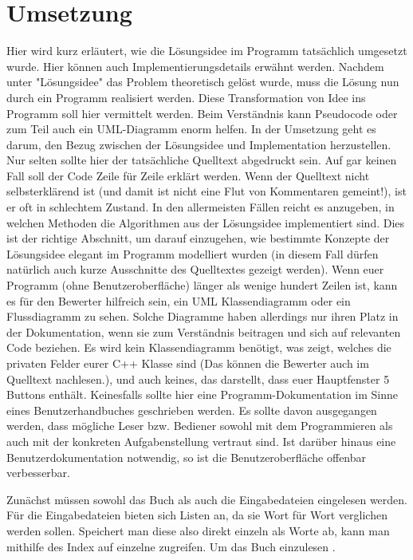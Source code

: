 \documentclass[a4paper,10pt,ngerman]{scrartcl}
\begin{document}
	\section{Umsetzung}\label{sec:umsetzung}
	Hier wird kurz erläutert, wie die Lösungsidee im Programm tatsächlich umgesetzt wurde.
	Hier können auch Implementierungsdetails erwähnt werden.
	Nachdem unter "Lösungsidee" das Problem theoretisch gelöst wurde, muss die Lösung nun durch ein Programm realisiert werden.
	Diese Transformation von Idee ins Programm soll hier vermittelt werden.
	Beim Verständnis kann Pseudocode oder zum Teil auch ein UML-Diagramm enorm helfen.
	In der Umsetzung geht es darum, den Bezug zwischen der Lösungsidee und Implementation herzustellen.
	Nur selten sollte hier der tatsächliche Quelltext abgedruckt sein.
	Auf gar keinen Fall soll der Code Zeile für Zeile erklärt werden.
	Wenn der Quelltext nicht selbsterklärend ist (und damit ist nicht eine Flut von Kommentaren gemeint!), ist er oft in schlechtem Zustand.
	In den allermeisten Fällen reicht es anzugeben, in welchen Methoden die Algorithmen aus der Lösungsidee implementiert sind.
	Dies ist der richtige Abschnitt, um darauf einzugehen, wie bestimmte Konzepte der Lösungsidee elegant im Programm modelliert wurden (in diesem Fall dürfen natürlich auch kurze Ausschnitte des Quelltextes gezeigt werden).
	Wenn euer Programm (ohne Benutzeroberfläche) länger als wenige hundert Zeilen ist, kann es für den Bewerter hilfreich sein, ein UML Klassendiagramm oder ein Flussdiagramm zu sehen.
	Solche Diagramme haben allerdings nur ihren Platz in der Dokumentation, wenn sie zum Verständnis beitragen und sich auf relevanten Code beziehen.
	Es wird kein Klassendiagramm benötigt, was zeigt, welches die privaten Felder eurer C++ Klasse sind (Das können die Bewerter auch im Quelltext nachlesen.), und auch keines, das darstellt, dass euer Hauptfenster 5 Buttons enthält.
	Keinesfalls sollte hier eine Programm-Dokumentation im Sinne eines Benutzerhandbuches geschrieben werden.
	Es sollte davon ausgegangen werden, dass mögliche Leser bzw. Bediener sowohl mit dem Programmieren als auch mit der konkreten Aufgabenstellung vertraut sind.
	Ist darüber hinaus eine Benutzerdokumentation notwendig, so ist die Benutzeroberfläche offenbar verbesserbar.
    	
		Zunächst müssen sowohl das Buch als auch die Eingabedateien eingelesen werden.
		Für die Eingabedateien bieten sich Listen an, da sie Wort für Wort verglichen werden sollen.
		Speichert man diese also direkt einzeln als Worte ab, kann man mithilfe des Index auf einzelne zugreifen.
		Um das Buch einzulesen .
\end{document}
